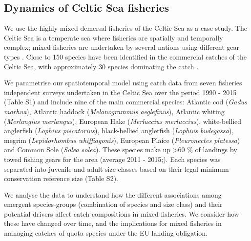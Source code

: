 \documentclass{nature}
\begin{document}
\begin{linenumbers}
\subsection{Dynamics of Celtic Sea fisheries}

We use the highly mixed demersal fisheries of the Celtic Sea as a case study.
The Celtic Sea is a temperate sea where fisheries are spatially and temporally
complex; mixed fisheries are undertaken by several nations using different gear
types \cite{Ellis2000, Gerritsen2012}. Close to 150 species have been
identified in the commercial catches of the Celtic Sea, with approximately 30
species dominating the catch \cite{Mateo2016}.

We parametrise our spatiotemporal model using catch data from seven fisheries
independent surveys undertaken in the Celtic Sea over the period 1990 - 2015
(Table S1) and include nine of the main commercial species: Atlantic cod
(\textit{Gadus morhua}), Atlantic haddock (\textit{Melanogrammus aeglefinus}),
Atlantic whiting (\textit{Merlangius merlangus}), European Hake
(\textit{Merluccius merluccius}), white-bellied anglerfish (\textit{Lophius
	piscatorius}), black-bellied anglerfish (\textit{Lophius budegassa}),
megrim (\textit{Lepidorhombus whiffiagonis}), European Plaice
(\textit{Pleuronectes platessa}) and Common Sole (\textit{Solea solea}). These
species make up \textgreater 60 \% of landings by towed fishing gears for the
area (average 2011 - 2015;\cite{STECF2017}). Each species was separated into
juvenile and adult size classes based on their legal minimum conservation
reference size (Table S2).

We analyse the data to understand how the different associations among emergent
species-groups (combination of species and size class) and their potential
drivers affect catch compositions in mixed fisheries. We consider how these
have changed over time, and the implications for mixed fisheries in managing
catches of quota species under the EU landing obligation.


\end{linenumbers}
\end{document}
